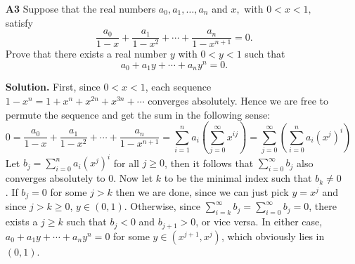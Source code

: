 \documentclass[11pt,a4paper]{article}
\begin{document}
\begin{enumerate}
	\item[\textbf{A3}]Suppose that the real numbers $a_0,a_1,\dots,a_n$ and $x,$ with $0<x<1,$ satisfy \[\frac{a_0}{1-x}+\frac{a_1}{1-x^2}+\cdots+\frac{a_n}{1-x^{n+1}}=0.\] Prove that there exists a real number $y$ with $0<y<1$ such that \[a_0+a_1y+\cdots+a_ny^n=0.\]
	
	\textbf{Solution.} First, since $0<x<1$, each sequence $1-x^n=1+x^n+x^{2n}+x^{3n}+\cdots$ converges absolutely. Hence we are free to permute the sequence and get the sum in the following sense: 
	\[0=\frac{a_0}{1-x}+\frac{a_1}{1-x^2}+\cdots+\frac{a_n}{1-x^{n+1}}
	=\sum_{i=1}^n a_i \left(\sum_{j=0}^{\infty} x^{ij}\right)
	=\sum_{j=0}^{\infty} \left(\sum_{i=0}^n a_i(x^{j})^i\right)
	\]
	Let $b_j=\sum_{i=0}^n a_i(x^{j})^i$ for all $j\ge 0$, then it follows that $\sum_{i=0}^\infty b_j$ also converges absolutely to 0. Now let $k$ to be the minimal index such that $b_k\neq 0$. If $b_j=0$ for some $j>k$ then we are done, since we can just pick $y=x^j$ and since $j>k\ge 0$, $y\in (0, 1)$. Otherwise, since $\sum_{i=k}^\infty b_j=\sum_{i=0}^\infty b_j=0$, there exists a $j\ge k$ such that $b_j<0$ and $b_{j+1}>0$, or vice versa. In either case, $a_0+a_1y+\cdots+a_ny^n=0$ for some $y\in (x^{j+1}, x^{j})$, which obviously lies in $(0, 1)$. 
\end{enumerate}
\end{document}

